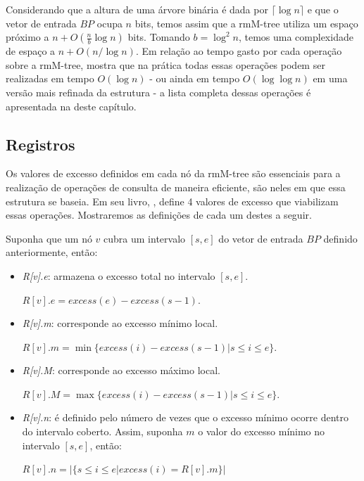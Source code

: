 Considerando que a altura de uma árvore binária é dada por $\lceil \log n \rceil$ e que o vetor de entrada $BP$ ocupa $n$ bits, temos assim que a rmM-tree utiliza um espaço próximo a $n + O(\frac{n}{b} \log n)$ bits. Tomando $b = \log^2 n$, temos uma complexidade de espaço a $n + O(n/\log n)$. Em relação ao tempo gasto por cada operação sobre a rmM-tree,  \citet{book-compact-data-structures} mostra que na prática todas essas operações podem ser realizadas em tempo $O(\log n)$ - ou ainda em tempo $O(\log \log n)$ em uma versão mais refinada da estrutura - a lista completa dessas operações é apresentada na  deste capítulo.


\subsection{Registros}
Os valores de excesso definidos em cada nó da rmM-tree são essenciais para a realização de operações de consulta de maneira eficiente, são neles em que essa estrutura se baseia.  Em seu livro, \citet{book-compact-data-structures}, define 4 valores de excesso que viabilizam essas operações. Mostraremos as definições de cada um destes a seguir. 

Suponha que um nó $v$ cubra um intervalo $[s,e]$ do vetor de entrada $BP$ definido anteriormente, então:
\begin{itemize}
    \item \textit{R[v].e}: armazena o excesso total no intervalo $[s,e]$.
    
    $R[v].e = excess(e) - excess(s-1)$.
    \item \textit{R[v].m}: corresponde ao excesso mínimo local.
    
    $R[v].m = \min\{excess(i) - excess(s - 1) | s \leq i \leq e\}$.
    \item \textit{R[v].M}: corresponde ao excesso máximo local.
    
    $R[v].M = \max\{excess(i) - excess(s - 1) | s \leq i \leq e\}$.
    
    \item \textit{R[v].n}: é definido pelo número de vezes que o excesso mínimo ocorre dentro do intervalo coberto. Assim, suponha $m$ o valor do excesso mínimo no intervalo $[s,e]$, então:

    $R[v].n = |\{s \leq i \leq e | excess(i) = R[v].m\}|$
\end{itemize}

